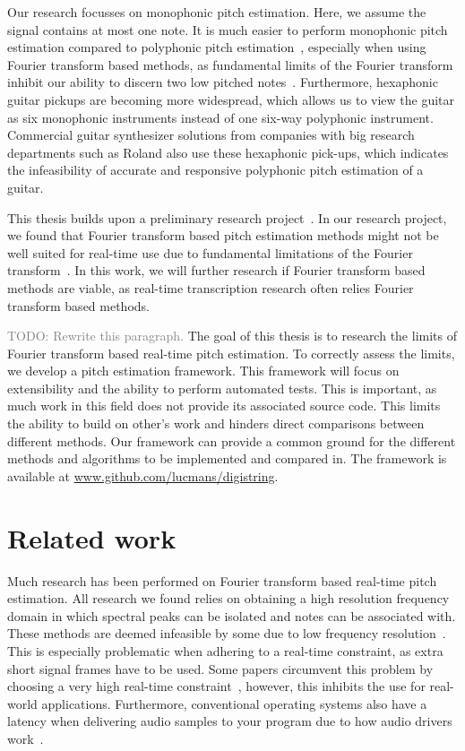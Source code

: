 \documentclass[10pt,twocolumn]{article}
\begin{document}
Our research focusses on monophonic pitch estimation. Here, we assume the signal contains at most one note. It is much easier to perform monophonic pitch estimation compared to polyphonic pitch estimation~\cite{monotopoly}, especially when using Fourier transform based methods, as fundamental limits of the Fourier transform inhibit our ability to discern two low pitched notes~\cite{nopoly}. Furthermore, hexaphonic guitar pickups are becoming more widespread, which allows us to view the guitar as six monophonic instruments instead of one six-way polyphonic instrument. Commercial guitar synthesizer solutions from companies with big research departments such as Roland also use these hexaphonic pick-ups, which indicates the infeasibility of accurate and responsive polyphonic pitch estimation of a guitar.

This thesis builds upon a preliminary research project~\cite{ik}. In our research project, we found that Fourier transform based pitch estimation methods might not be well suited for real-time use due to fundamental limitations of the Fourier transform~\cite{fourierlimit}. In this work, we will further research if Fourier transform based methods are viable, as real-time transcription research often relies Fourier transform based methods.

\textcolor{gray}{TODO: Rewrite this paragraph.} The goal of this thesis is to research the limits of Fourier transform based real-time pitch estimation. To correctly assess the limits, we develop a pitch estimation framework. This framework will focus on extensibility and the ability to perform automated tests. This is important, as much work in this field does not provide its associated source code. This limits the ability to build on other's work and hinders direct comparisons between different methods. Our framework can provide a common ground for the different methods and algorithms to be implemented and compared in. The framework is available at \url{www.github.com/lucmans/digistring}.


\section{Related work}  \label{sec:related}
Much research has been performed on Fourier transform based real-time pitch estimation. All research we found relies on obtaining a high resolution frequency domain in which spectral peaks can be isolated and notes can be associated with. These methods are deemed infeasible by some due to low frequency resolution~\cite{fourierlimit}.%
This is especially problematic when adhering to a real-time constraint, as extra short signal frames have to be used. Some papers circumvent this problem by choosing a very high real-time constraint~\cite{sloomboi, sloomboi2}, however, this inhibits the use for real-world applications. Furthermore, conventional operating systems also have a latency when delivering audio samples to your program due to how audio drivers work~\cite{oslatency}.
\end{document}

